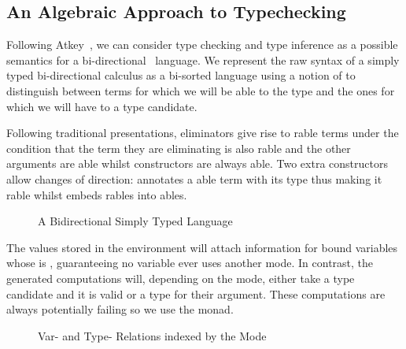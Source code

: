 \subsection{An Algebraic Approach to Typechecking}\label{section:typechecking}

Following Atkey~\citeyear{atkey2015algebraic}, we can consider type checking
and type inference as a possible semantics for a bi-directional~\cite{pierce2000local}
language. We represent the raw syntax of a simply typed bi-directional calculus
as a bi-sorted language using a notion of  to distinguish between terms
for which we will be able to  the type and the ones for which we will
have to  a type candidate.

Following traditional presentations, eliminators give rise to rable
terms under the condition that the term they are eliminating is also rable
and the other arguments are able whilst constructors are always able.
Two extra constructors allow changes of direction:  annotates a able
term with its type thus making it rable whilst  embeds rables
into ables.

\begin{figure}[h]
\begin{minipage}{0.3\textwidth}
\end{minipage}\hfill
\begin{minipage}{0.6\textwidth}
\end{minipage}
\caption{A Bidirectional Simply Typed Language}
\end{figure}

The values stored in the environment will attach  information for
bound variables whose  is , guaranteeing no variable ever
uses another mode. In contrast, the generated computations will, depending
on the mode, either take a type candidate and  it is valid or
 a type for their argument. These computations are always potentially
failing so we use the  monad.

\begin{figure}[h]
\begin{minipage}{0.40\textwidth}
\end{minipage}\hfill
\begin{minipage}{0.50\textwidth}
\end{minipage}
\caption{Var- and Type- Relations indexed by the Mode}
\end{figure}

